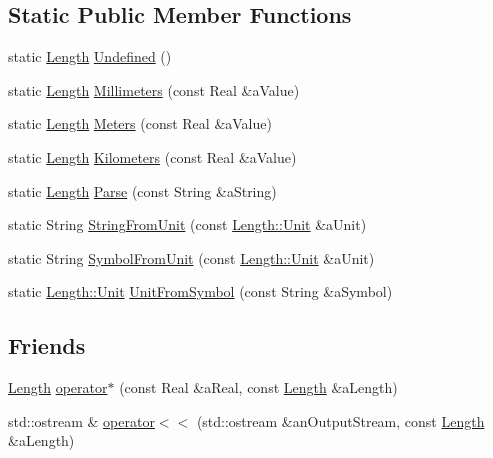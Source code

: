 \subsection*{Static Public Member Functions}
\begin{DoxyCompactItemize}
\item 
static \hyperlink{classostk_1_1physics_1_1units_1_1_length}{Length} \hyperlink{classostk_1_1physics_1_1units_1_1_length_a1e76f961e57ed36274cf75e860b68726}{Undefined} ()
\item 
static \hyperlink{classostk_1_1physics_1_1units_1_1_length}{Length} \hyperlink{classostk_1_1physics_1_1units_1_1_length_a37a93f5c180723b39410c5e9757a9384}{Millimeters} (const Real \&a\+Value)
\item 
static \hyperlink{classostk_1_1physics_1_1units_1_1_length}{Length} \hyperlink{classostk_1_1physics_1_1units_1_1_length_ad227977ce00756791595796a0dd5ddd7}{Meters} (const Real \&a\+Value)
\item 
static \hyperlink{classostk_1_1physics_1_1units_1_1_length}{Length} \hyperlink{classostk_1_1physics_1_1units_1_1_length_accc55f3532825355cb54ab8e6bf970b9}{Kilometers} (const Real \&a\+Value)
\item 
static \hyperlink{classostk_1_1physics_1_1units_1_1_length}{Length} \hyperlink{classostk_1_1physics_1_1units_1_1_length_a757f89c932805e4bc75d691900ce406a}{Parse} (const String \&a\+String)
\item 
static String \hyperlink{classostk_1_1physics_1_1units_1_1_length_a0741ec3f518921e55ea97819bcd12f8e}{String\+From\+Unit} (const \hyperlink{classostk_1_1physics_1_1units_1_1_length_a2664470a7eedf5d45c88861fe69badea}{Length\+::\+Unit} \&a\+Unit)
\item 
static String \hyperlink{classostk_1_1physics_1_1units_1_1_length_a2747d33c0210375fd9c09ad75f90b822}{Symbol\+From\+Unit} (const \hyperlink{classostk_1_1physics_1_1units_1_1_length_a2664470a7eedf5d45c88861fe69badea}{Length\+::\+Unit} \&a\+Unit)
\item 
static \hyperlink{classostk_1_1physics_1_1units_1_1_length_a2664470a7eedf5d45c88861fe69badea}{Length\+::\+Unit} \hyperlink{classostk_1_1physics_1_1units_1_1_length_a91418e40747b13b0e2b669ec55626afa}{Unit\+From\+Symbol} (const String \&a\+Symbol)
\end{DoxyCompactItemize}
\subsection*{Friends}
\begin{DoxyCompactItemize}
\item 
\hyperlink{classostk_1_1physics_1_1units_1_1_length}{Length} \hyperlink{classostk_1_1physics_1_1units_1_1_length_a72059ec2f1e930a0e75a3a808e434363}{operator$\ast$} (const Real \&a\+Real, const \hyperlink{classostk_1_1physics_1_1units_1_1_length}{Length} \&a\+Length)
\item 
std\+::ostream \& \hyperlink{classostk_1_1physics_1_1units_1_1_length_a95a13170a8d57cb0060eae94520eace4}{operator$<$$<$} (std\+::ostream \&an\+Output\+Stream, const \hyperlink{classostk_1_1physics_1_1units_1_1_length}{Length} \&a\+Length)
\end{DoxyCompactItemize}

